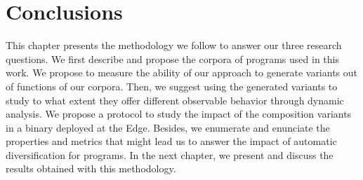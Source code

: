 
\section*{Conclusions}

This chapter presents the methodology we follow to answer our three research questions. We first describe and propose the corpora of programs used in this work. We propose to measure the ability of our approach to generate variants out of  functions of our corpora. Then, we suggest using the generated variants to study to what extent they offer different observable behavior through dynamic analysis. We propose a protocol to study the impact of the composition variants in a binary deployed at the Edge. Besides, we enumerate and enunciate the properties and metrics that might lead us to answer the impact of automatic diversification for \wasm programs. In the next chapter, we present and discuss the results obtained with this methodology.



\clearpage